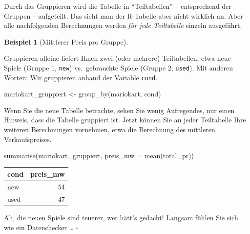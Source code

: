 \documentclass[
  letterpaper,
  twoside,
  open=any]{scrbook}
\newenvironment{Shaded}{\begin{snugshade}}{\end{snugshade}}
\newcommand{\AttributeTok}[1]{\textcolor[rgb]{0.40,0.45,0.13}{#1}}
\newcommand{\FunctionTok}[1]{\textcolor[rgb]{0.28,0.35,0.67}{#1}}
\newcommand{\NormalTok}[1]{\textcolor[rgb]{0.00,0.23,0.31}{#1}}
\newcommand{\OtherTok}[1]{\textcolor[rgb]{0.00,0.23,0.31}{#1}}
\theoremstyle{definition}
\theoremstyle{definition}
\newtheorem{example}{Beispiel}[chapter]
\theoremstyle{definition}
\theoremstyle{remark}
\begin{document}
Durch das Gruppieren wird die Tabelle in \enquote{Teiltabellen} --
entsprechend der Gruppen -- aufgeteilt. Das sieht man der R-Tabelle aber
nicht wirklich an. Aber alle nachfolgenden Berechnungen werden \emph{für
jede Teiltabelle} einzeln ausgeführt.

\begin{example}[Mittlerer Preis pro
Gruppe]\protect\hypertarget{exm-groupby}{}\label{exm-groupby}

Gruppieren alleine liefert Ihnen zwei (oder mehrere) Teiltabellen, etwa
neue Spiele (Gruppe 1, \texttt{new}) vs.~gebrauchte Spiele (Gruppe 2,
\texttt{used}). Mit anderen Worten: Wir gruppieren anhand der Variable
\texttt{cond}.

\begin{Shaded}
\begin{Highlighting}[]
\NormalTok{mariokart\_gruppiert }\OtherTok{\textless{}{-}} \FunctionTok{group\_by}\NormalTok{(mariokart, cond)}
\end{Highlighting}
\end{Shaded}

Wenn Sie die neue Tabelle betrachte, sehen Sie wenig Aufregendes, nur
einen Hinweis, dass die Tabelle gruppiert ist. Jetzt können Sie an jeder
Teiltabelle Ihre weiteren Berechnungen vornehmen, etwa die Berechnung
des mittleren Verkaufspreises.

\begin{Shaded}
\begin{Highlighting}[]
\FunctionTok{summarise}\NormalTok{(mariokart\_gruppiert, }\AttributeTok{preis\_mw =} \FunctionTok{mean}\NormalTok{(total\_pr))}
\end{Highlighting}
\end{Shaded}

\begin{longtable}[]{@{}lr@{}}
\toprule\noalign{}
cond & preis\_mw \\
\midrule\noalign{}
\endhead
\bottomrule\noalign{}
\endlastfoot
new & 54 \\
used & 47 \\
\end{longtable}

Ah, die neuen Spiele sind teuerer, wer hätt's gedacht! Langsam fühlen
Sie sich wie ein Datenchecker \ldots{} \(\square\)

\end{example}
\end{document}

